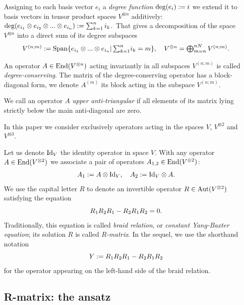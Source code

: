 \documentclass[11pt]{article}
\def\be{\begin{equation}}\def\ee{\end{equation}}
\begin{document}
Assigning to each basis vector $e_i$ a {\em degree function} ${\rm deg} (e_i):= i$ we extend it to   basis vectors in tensor product spaces $V^{\otimes n}$ additively:\,
$
{\rm deg}(e_{i_1} \otimes e_{i_2} \otimes... \otimes e_{i_n}):=\sum_{k=1}^{n} i_k
$.\,
That gives a decomposition of the space $V^{\otimes n}$ into a direct sum of its degree subspaces
\be
\lb{deg-spaces}
\textstyle
V^{(n;m)}:= {\rm Span}\{e_{i_1} \otimes...\otimes e_{i_n}|\,{\textstyle\sum_{k=1}^n} i_k = m\}, \quad
V^{\otimes n}= \bigoplus_{m=n}^{ n N }V^{(n;m)}.
\ee

An operator $A\in {\rm End}(V^{\otimes n})$ acting invariantly in all subspaces $V^{(n;m)}$ is called {\em degree-conserving}.
The matrix of the degree-conserving operator has a block-diagonal form, we denote $A^{(m)}$ its block acting in the subspace $V^{(n;m)}$. 

We call an operator $A$ {\em upper anti-triangular} if all elements of its matrix lying strictly below the main anti-diagonal are zero. 
\smallskip

In this paper we consider exclusively operators acting in the spaces $V$, $V^{\otimes 2 }$ and $V^{\otimes 3 }$. 

Let us denote ${\rm Id}_V$ the identity operator in space $V$. With any operator $A\in {\rm End}(V^{\otimes 2})$ we associate a pair of operators 
$A_{1,2}\in {\rm End}(V^{\otimes 2})$:
\be
\lb{A1,2}
A_1:= A\otimes{\rm Id}_V, \quad A_2:= {\rm Id}_V\otimes A.
\ee
We use the capital letter $R$ to denote an invertible operator $R\in {\rm Aut}(V^{\otimes 2})$ satisfying the equation
\be
\lb{YB}
R_1 R_2 R_1 - R_2 R_1 R_2 =0. 
\ee
Traditionally, this equation is called {\em braid relation}, or {\em constant Yang-Baxter equation};  its solution $R$ is called {\em $R$-matrix}. In the sequel, we  use the shorthand notation 
\be
\lb{Y}
Y:=R_1 R_2 R_1 - R_2 R_1 R_2
\ee
for the operator appearing on the left-hand side of the braid relation.


\subsection{R-matrix: the ansatz}
\end{document}

